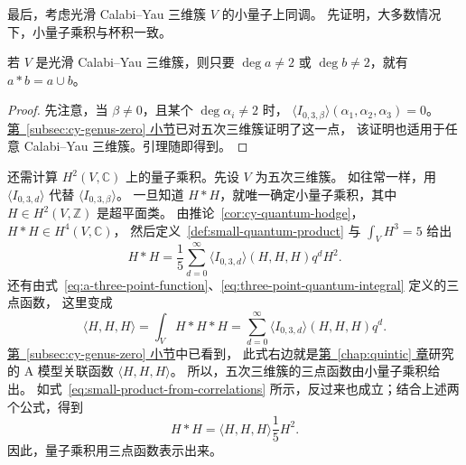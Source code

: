 \begin{example}\label{ex:cy-small-quantum}
最后，考虑光滑 Calabi--Yau 三维簇 $V$ 的小量子上同调。
先证明，大多数情况下，小量子乘积与杯积一致。
\begin{lemma}\label{lem:cy-quantum-cup}
若 $V$ 是光滑 Calabi--Yau 三维簇，则只要 $\deg a\ne2$ 或 $\deg b\ne2$，就有 $a*b=a\cup b$。
\end{lemma}
\begin{proof}
先注意，当 $\beta\ne0$，且某个 $\deg\alpha_i\ne2$ 时，
$\langle I_{0,3,\beta}\rangle(\alpha_1,\alpha_2,\alpha_3)=0$。
\hyperref[subsec:cy-genus-zero]{第~\ref*{subsec:cy-genus-zero} 小节}已对五次三维簇证明了这一点，
该证明也适用于任意 Calabi--Yau 三维簇。引理随即得到。
\end{proof}
还需计算 $H^2(V,\mathbb C)$ 上的量子乘积。先设 $V$ 为五次三维簇。
如往常一样，用 $\langle I_{0,3,d}\rangle$ 代替 $\langle I_{0,3,\beta}\rangle$。
一旦知道 $H*H$，就唯一确定小量子乘积，其中
$H\in H^2(V,\mathbb Z)$ 是超平面类。
由推论~\ref{cor:cy-quantum-hodge}，$H*H\in H^4(V,\mathbb C)$，
然后定义~\ref{def:small-quantum-product} 与 $\int_VH^3=5$ 给出
\[
H*H=\frac15\sum_{d=0}^{\infty}\langle I_{0,3,d}\rangle(H,H,H)q^dH^2.
\]
还有由式~\eqref{eq:a-three-point-function}、\eqref{eq:three-point-quantum-integral} 定义的三点函数，
这里变成
\begin{equation}\label{eq:quintic-quantum-correlation}
\langle H,H,H\rangle=\int_VH*H*H
=\sum_{d=0}^{\infty}\langle I_{0,3,d}\rangle(H,H,H)q^d.
\end{equation}
\hyperref[subsec:cy-genus-zero]{第~\ref*{subsec:cy-genus-zero} 小节}中已看到，
此式右边就是\hyperref[chap:quintic]{第~\ref*{chap:quintic} 章}研究的 A 模型关联函数 $\langle H,H,H\rangle$。
所以，五次三维簇的三点函数由小量子乘积给出。
如式~\eqref{eq:small-product-from-correlations} 所示，反过来也成立；结合上述两个公式，得到
\[
H*H=\langle H,H,H\rangle\frac15H^2.
\]
因此，量子乘积用三点函数表示出来。


\end{example}
